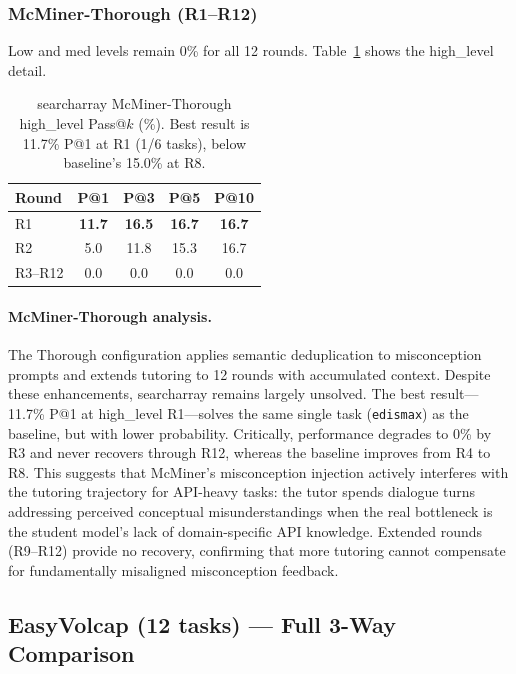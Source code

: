 \documentclass[11pt]{article}
\begin{document}
\subsubsection{McMiner-Thorough (R1--R12)}

Low and med levels remain 0\% for all 12 rounds. Table~\ref{tab:app-sa-mc} shows the high\_level detail.

\begin{table}[h]
  \centering
  \small
  \begin{tabular}{lcccc}
    \toprule
    \textbf{Round} & \textbf{P@1} & \textbf{P@3} & \textbf{P@5} & \textbf{P@10} \\
    \midrule
    R1 & \textbf{11.7} & \textbf{16.5} & \textbf{16.7} & \textbf{16.7} \\
    R2 & 5.0 & 11.8 & 15.3 & 16.7 \\
    R3--R12 & 0.0 & 0.0 & 0.0 & 0.0 \\
    \bottomrule
  \end{tabular}
  \caption{searcharray McMiner-Thorough high\_level Pass@$k$ (\%). Best result is 11.7\% P@1 at R1 (1/6 tasks), below baseline's 15.0\% at R8.}
  \label{tab:app-sa-mc}
\end{table}

\paragraph{McMiner-Thorough analysis.} The Thorough configuration applies semantic deduplication to misconception prompts and extends tutoring to 12 rounds with accumulated context. Despite these enhancements, searcharray remains largely unsolved. The best result---11.7\% P@1 at high\_level R1---solves the same single task (\texttt{edismax}) as the baseline, but with lower probability. Critically, performance degrades to 0\% by R3 and never recovers through R12, whereas the baseline improves from R4 to R8. This suggests that McMiner's misconception injection actively interferes with the tutoring trajectory for API-heavy tasks: the tutor spends dialogue turns addressing perceived conceptual misunderstandings when the real bottleneck is the student model's lack of domain-specific API knowledge. Extended rounds (R9--R12) provide no recovery, confirming that more tutoring cannot compensate for fundamentally misaligned misconception feedback.

\subsection{EasyVolcap (12 tasks) --- Full 3-Way Comparison}
\end{document}
